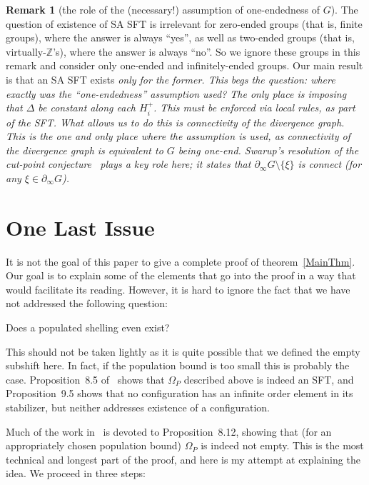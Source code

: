 \documentclass[12pt,reqno]{amsart}
\theoremstyle{plain}
\theoremstyle{definition}
\numberwithin{subcase}{case}
\theoremstyle{plain}
\theoremstyle{definition}
\newtheorem{remark}[thm]{Remark}
\begin{document}
\begin{remark}[the role of the (necessary!) assumption of one-endedness of \(G\)] 
The question of existence of SA SFT is irrelevant for zero-ended groups (that is, finite groups), where the answer is always ``yes'', as well as two-ended groups (that is, virtually-\(\mathbb{Z}\)'s), where the answer is always ``no''. So we ignore these groups in this remark and consider only one-ended and infinitely-ended groups. Our main result is that an SA SFT exists \em only \em for the former. This begs the question: where exactly was the ``one-endedness'' assumption used? The only place is {\it imposing that \(\Delta\) be constant along each \(H^{+}_{i}\)}. This must be enforced via local rules, as part of the SFT. What allows us to do this is \em connectivity of the divergence graph\em. This is the one and only place where the assumption is used, as connectivity of the divergence graph is equivalent to \(G\) being one-end. Swarup's resolution of the cut-point conjecture~\cite{MR1412948} plays a key role here; it states that \(\partial_{\infty} G \setminus \{\xi\}\) is connect (for any \(\xi \in \partial_{\infty} G\)).
\end{remark}




\section{One Last Issue}

It is not the goal of this paper to give a complete proof of theorem~\ref{MainThm}. Our goal is to explain some of the elements that go into the proof in a way that would facilitate its reading. However, it is hard to ignore the fact that we have not addressed the following question:
\begin{center}
Does a populated shelling even exist?
\end{center}
This should not be taken lightly as it is quite possible that we defined the empty subshift here. In fact, if the population bound is too small this is probably the case. Proposition~8.5 of~\cite{cohen_goodman-strauss_rieck_2021} shows that \(\Omega_{P}\) described above is indeed an SFT, and Proposition~9.5 shows that no configuration has an infinite order element in its stabilizer, but neither addresses existence of a configuration.

Much of the work in~\cite{cohen_goodman-strauss_rieck_2021} is devoted to Proposition~8.12, showing that (for an appropriately chosen population bound) \(\Omega_{P}\) is indeed not empty. This is the most technical and longest part of the proof, and here is my attempt at explaining the idea. We proceed in three steps:
\end{document}
